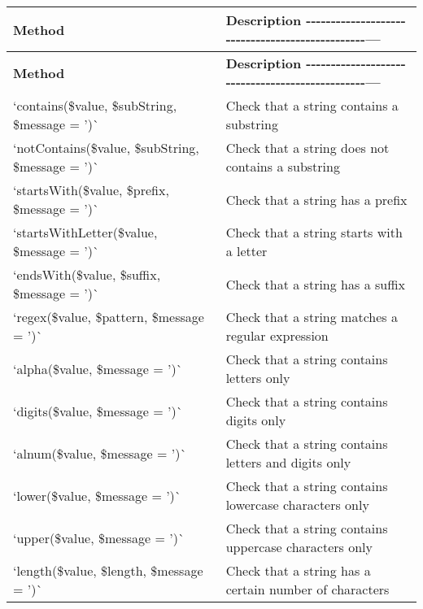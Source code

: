 \tabulinesep=1mm
\begin{longtabu} spread 0pt [c]{*{2}{|X[-1]}|}
\hline
\rowcolor{\tableheadbgcolor}\textbf{ Method  }&\textbf{ Description -\/-\/-\/-\/-\/-\/-\/-\/-\/-\/-\/-\/-\/-\/-\/-\/-\/-\/-\/-\/-\/-\/-\/-\/-\/-\/-\/-\/-\/-\/-\/-\/-\/-\/-\/-\/-\/-\/-\/-\/-\/-\/-\/-\/-\/-\/-\/-\/---   }\\
\endfirsthead
\hline
\endfoot
\hline
\rowcolor{\tableheadbgcolor}\textbf{ Method  }&\textbf{ Description -\/-\/-\/-\/-\/-\/-\/-\/-\/-\/-\/-\/-\/-\/-\/-\/-\/-\/-\/-\/-\/-\/-\/-\/-\/-\/-\/-\/-\/-\/-\/-\/-\/-\/-\/-\/-\/-\/-\/-\/-\/-\/-\/-\/-\/-\/-\/-\/---   }\\
\endhead
`contains(\$value, \$sub\+String, \$message = '\textquotesingle{})\`{}  &Check that a string contains a substring   \\
`not\+Contains(\$value, \$sub\+String, \$message = '\textquotesingle{})\`{}  &Check that a string does not contains a substring   \\
`starts\+With(\$value, \$prefix, \$message = '\textquotesingle{})\`{}  &Check that a string has a prefix   \\
`starts\+With\+Letter(\$value, \$message = '\textquotesingle{})\`{}  &Check that a string starts with a letter   \\
`ends\+With(\$value, \$suffix, \$message = '\textquotesingle{})\`{}  &Check that a string has a suffix   \\
`regex(\$value, \$pattern, \$message = '\textquotesingle{})\`{}  &Check that a string matches a regular expression   \\
`alpha(\$value, \$message = '\textquotesingle{})\`{}  &Check that a string contains letters only   \\
`digits(\$value, \$message = '\textquotesingle{})\`{}  &Check that a string contains digits only   \\
`alnum(\$value, \$message = '\textquotesingle{})\`{}  &Check that a string contains letters and digits only   \\
`lower(\$value, \$message = '\textquotesingle{})\`{}  &Check that a string contains lowercase characters only   \\
`upper(\$value, \$message = '\textquotesingle{})\`{}  &Check that a string contains uppercase characters only   \\
`length(\$value, \$length, \$message = '\textquotesingle{})\`{}  &Check that a string has a certain number of characters   \\

\end{longtabu}
